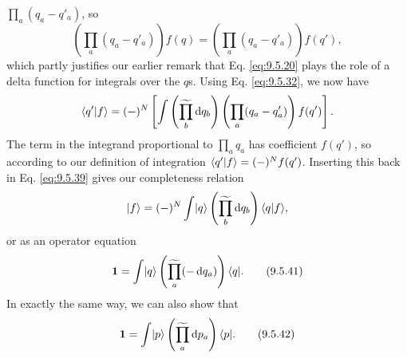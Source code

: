 
$\prod_a(q_a-q'_a)$, so
\begin{equation}
\left(\prod_a(q_a-q'_a)\right)f(q)
=\left(\prod_a(q_a-q'_a)\right)f(q'),
\tag{9.5.40}\label{eq:9.5.40}
\end{equation}
which partly justifies our earlier remark that Eq. \eqref{eq:9.5.20} plays the role of a
delta function for integrals over the $q$s. Using Eq. \eqref{eq:9.5.32}, we now have
\[
\langle q' | f\rangle=(-)^N\left[
 \int\left(\widetilde{\prod_b}\mathop{}\!\mathrm{d} q_b\right)
 \left(\prod_a(q_a-q'_a)\right)f(q')\right].
\]
The term in the integrand proportional to $\prod_aq_a$ has coefficient
$f(q')$, so according to our definition of integration
$\langle q' | f\rangle=(-)^Nf(q')$. Inserting this back in Eq. \eqref{eq:9.5.39} gives our
completeness relation
\[
\lvert f\rangle=(-)^N\int\lvert q\rangle
 \left(\widetilde{\prod_b}\mathop{}\!\mathrm{d} q_b\right)\langle q | f\rangle,
\]
or as an operator equation
\begin{equation}
\mathbf{1}=\int\lvert q\rangle
 \left(\widetilde{\prod_a}(-\mathop{}\!\mathrm{d} q_a)\right)\langle q\rvert.
\tag{9.5.41}\label{eq:9.5.41}
\end{equation}
In exactly the same way, we can also show that
\begin{equation}
\mathbf{1}=\int\lvert p\rangle
 \left(\widetilde{\prod_a}\mathop{}\!\mathrm{d} p_a\right)\langle p\rvert.
\tag{9.5.42}\label{eq:9.5.42}
\end{equation}

